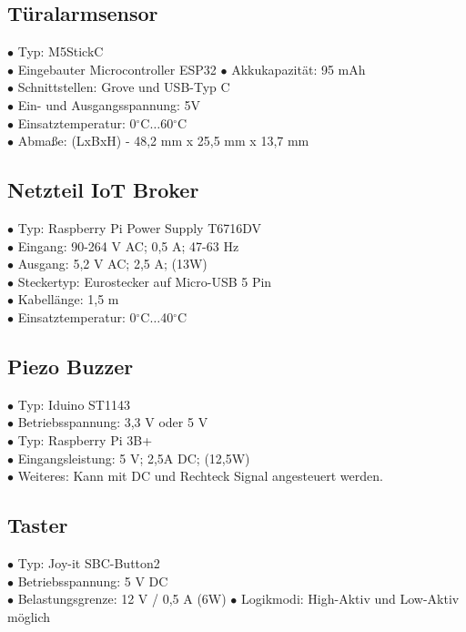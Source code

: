 \documentclass[a4paper,12pt]{article}
\begin{document}
	\subsection{Türalarmsensor}
	
	$\bullet$ Typ: M5StickC\\ 
	$\bullet$ Eingebauter Microcontroller ESP32
	$\bullet$ Akkukapazität: 95 mAh\\ 
	$\bullet$ Schnittstellen: Grove und USB-Typ C\\ 
	$\bullet$ Ein- und Ausgangsspannung: 5V\\ 
	$\bullet$ Einsatztemperatur: 0$^\circ$C$\dots$60$^\circ$C\\ 
	$\bullet$ Abmaße: (LxBxH) - 48,2 mm x 25,5 mm x 13,7 mm
	
	
	\subsection{Netzteil IoT Broker}
		$\bullet$ Typ: Raspberry Pi Power Supply T6716DV\\ 
	$\bullet$ Eingang: 90-264 V AC; 0,5 A; 47-63 Hz \\
	$\bullet$ Ausgang: 5,2 V AC; 2,5 A; (13W)\\ 
	$\bullet$ Steckertyp: Eurostecker auf Micro-USB 5 Pin \\ 
	$\bullet$ Kabellänge: 1,5 m\\ 
	$\bullet$ Einsatztemperatur:
	0$^\circ$C$\dots$40$^\circ$C 
	
	
	\subsection{Piezo Buzzer}
	$\bullet$ Typ: Iduino ST1143\\ 
	$\bullet$ Betriebsspannung: 3,3 V oder 5 V \\
	$\bullet$ Typ: Raspberry Pi 3B+\\ 
	$\bullet$ Eingangsleistung: 5 V; 2,5A DC; (12,5W) \\
	$\bullet$ Weiteres: Kann mit DC und Rechteck Signal angesteuert werden.
	
	\subsection{Taster}  
		$\bullet$ Typ: Joy-it SBC-Button2\\ 
		$\bullet$ Betriebsspannung: 5 V DC\\
		$\bullet$ Belastungsgrenze: 12 V / 0,5 A (6W)
		$\bullet$ Logikmodi: High-Aktiv und Low-Aktiv möglich
	
\end{document}
